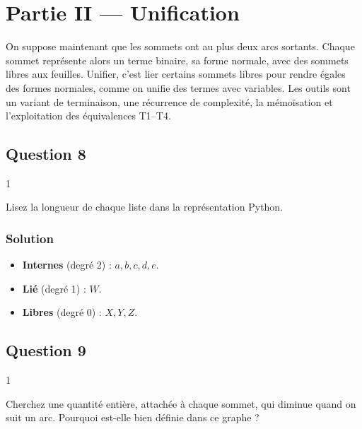 \documentclass[11pt,a4paper]{article}
\providecommand{\tightlist}{\setlength{\itemsep}{0pt}\setlength{\parskip}{0pt}}
\begin{document}
\hypertarget{partie-ii-unification}{%
\section{Partie II --- Unification}\label{partie-ii-unification}}

On suppose maintenant que les sommets ont au plus deux arcs sortants. Chaque sommet représente alors un terme binaire, sa forme normale, avec des sommets libres aux feuilles. Unifier, c'est lier certains sommets libres pour rendre égales des formes normales, comme on unifie des termes avec variables. Les outils sont un variant de terminaison, une récurrence de complexité, la mémoïsation et l'exploitation des équivalences T1--T4.

\hypertarget{question-8}{%
\subsection{Question 8}\label{question-8}}

\begin{indication}{1}

Lisez la longueur de chaque liste dans la représentation Python.

\end{indication}

\hypertarget{solution-7}{%
\subsubsection{Solution}\label{solution-7}}

\begin{itemize}
\tightlist
\item
  \textbf{Internes} (degré 2) : \(a,b,c,d,e\).
\item
  \textbf{Lié} (degré 1) : \(W\).
\item
  \textbf{Libres} (degré 0) : \(X,Y,Z\).
\end{itemize}

\hypertarget{question-9}{%
\subsection{Question 9}\label{question-9}}

\begin{indication}{1}

Cherchez une quantité entière, attachée à chaque sommet, qui diminue quand on suit un arc. Pourquoi est-elle bien définie dans ce graphe ?

\end{indication}
\end{document}
